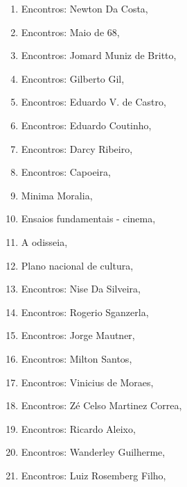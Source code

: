 \pagebreak
\pagestyle{azouguecat}

\begin{multicols}{2}
\begin{enumerate}
\setlength\parskip{8pt}
\setlength\itemsep{-1.4mm}
\item Encontros: Newton Da Costa, {}
\item Encontros: Maio de 68, {}
\item Encontros: Jomard Muniz de Britto, {}
\item Encontros: Gilberto Gil, {}
\item Encontros: Eduardo V. de Castro, {}
\item Encontros: Eduardo Coutinho, {}
\item Encontros: Darcy Ribeiro, {}
\item Encontros: Capoeira, {}
\item Minima Moralia, {}
\item Ensaios fundamentais - cinema, {}
\item A odisseia, {}
\item Plano nacional de cultura, {}
\item Encontros: Nise Da Silveira, {}
\item Encontros: Rogerio Sganzerla, {}
\item Encontros: Jorge Mautner, {}
\item Encontros: Milton Santos, {}
\item Encontros: Vinicius de Moraes, {}
\item Encontros: Zé Celso Martinez Correa, {}
\item Encontros: Ricardo Aleixo, {}
\item Encontros: Wanderley Guilherme, {}
\item Encontros: Luiz Rosemberg Filho, {}

\end{enumerate}
\end{multicols}
